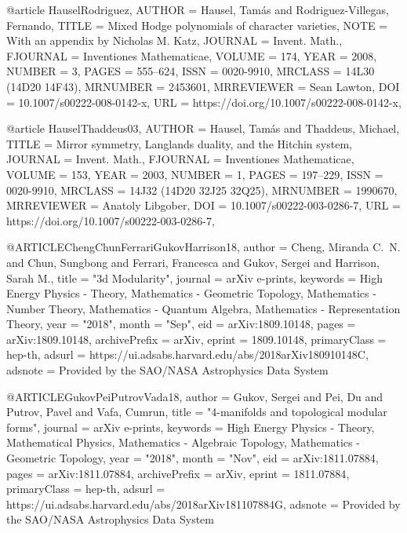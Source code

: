 @article {HauselRodriguez,
    AUTHOR = {Hausel, Tam\'{a}s and Rodriguez-Villegas, Fernando},
     TITLE = {Mixed {H}odge polynomials of character varieties},
      NOTE = {With an appendix by Nicholas M. Katz},
   JOURNAL = {Invent. Math.},
  FJOURNAL = {Inventiones Mathematicae},
    VOLUME = {174},
      YEAR = {2008},
    NUMBER = {3},
     PAGES = {555--624},
      ISSN = {0020-9910},
   MRCLASS = {14L30 (14D20 14F43)},
  MRNUMBER = {2453601},
MRREVIEWER = {Sean Lawton},
       DOI = {10.1007/s00222-008-0142-x},
       URL = {https://doi.org/10.1007/s00222-008-0142-x},
}

@article {HauselThaddeus03,
    AUTHOR = {Hausel, Tam\'{a}s and Thaddeus, Michael},
     TITLE = {Mirror symmetry, {L}anglands duality, and the {H}itchin
              system},
   JOURNAL = {Invent. Math.},
  FJOURNAL = {Inventiones Mathematicae},
    VOLUME = {153},
      YEAR = {2003},
    NUMBER = {1},
     PAGES = {197--229},
      ISSN = {0020-9910},
   MRCLASS = {14J32 (14D20 32J25 32Q25)},
  MRNUMBER = {1990670},
MRREVIEWER = {Anatoly Libgober},
       DOI = {10.1007/s00222-003-0286-7},
       URL = {https://doi.org/10.1007/s00222-003-0286-7},
}

@ARTICLE{ChengChunFerrariGukovHarrison18,
       author = {{Cheng}, Miranda C.~N. and {Chun}, Sungbong and {Ferrari}, Francesca and
         {Gukov}, Sergei and {Harrison}, Sarah M.},
        title = "{3d Modularity}",
      journal = {arXiv e-prints},
     keywords = {High Energy Physics - Theory, Mathematics - Geometric Topology, Mathematics - Number Theory, Mathematics - Quantum Algebra, Mathematics - Representation Theory},
         year = "2018",
        month = "Sep",
          eid = {arXiv:1809.10148},
        pages = {arXiv:1809.10148},
archivePrefix = {arXiv},
       eprint = {1809.10148},
 primaryClass = {hep-th},
       adsurl = {https://ui.adsabs.harvard.edu/abs/2018arXiv180910148C},
      adsnote = {Provided by the SAO/NASA Astrophysics Data System}
}

@ARTICLE{GukovPeiPutrovVada18,
       author = {{Gukov}, Sergei and {Pei}, Du and {Putrov}, Pavel and {Vafa}, Cumrun},
        title = "{4-manifolds and topological modular forms}",
      journal = {arXiv e-prints},
     keywords = {High Energy Physics - Theory, Mathematical Physics, Mathematics - Algebraic Topology, Mathematics - Geometric Topology},
         year = "2018",
        month = "Nov",
          eid = {arXiv:1811.07884},
        pages = {arXiv:1811.07884},
archivePrefix = {arXiv},
       eprint = {1811.07884},
 primaryClass = {hep-th},
       adsurl = {https://ui.adsabs.harvard.edu/abs/2018arXiv181107884G},
      adsnote = {Provided by the SAO/NASA Astrophysics Data System}
}

